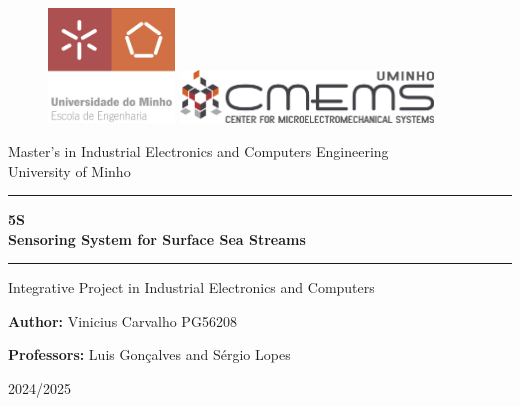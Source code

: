 \centering
\begin{figure}[h!]  %
    \centering
    \includegraphics[width=0.3\textwidth]{images/logos/ENG-EN.png}  %
    \label{fig:UM logo}
    \hspace{0.1cm}
    \includegraphics[width=0.6\textwidth]{images/logos/CMEMS.png}  %
    \label{fig:CMEMS logo}
    

\end{figure}
\vspace{0.25in}
\large
Master’s in Industrial Electronics and Computers Engineering \\
\vspace{0.15in}
\LARGE
University of Minho\\
\vspace{0.35in}
\hrule

\vspace{0.2in}
\textbf{\Huge 5S \\ \Large Sensoring System for Surface Sea Streams}
\vspace{0.2in}

\hrule
\vspace{0.2in}
\large
Integrative Project in Industrial Electronics and Computers
\vspace{4in}

\textbf{Author:}
Vinicius Carvalho PG56208

\vspace{0.1in}

\textbf{Professors:}
Luis Gonçalves and
Sérgio Lopes

\vfill

2024/2025